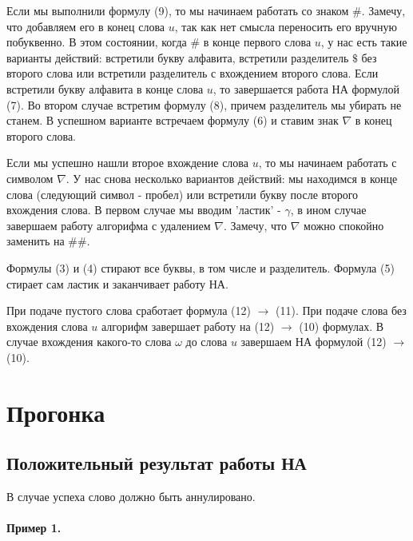  \medskip

 Если мы выполнили формулу (9), то мы начинаем работать со знаком $\#$.
 Замечу, что добавляем его в конец слова $u$, так как нет смысла переносить его вручную побуквенно.
 В этом состоянии, когда $\#$ в конце первого слова  $u$, у нас есть такие варианты действий:
 встретили букву алфавита, встретили разделитель  $\$$ без второго слова или встретили
 разделитель с вхождением второго слова. Если встретили букву алфавита в конце слова  $u$, то
 завершается работа НА формулой (7). Во втором случае встретим формулу (8), причем разделитель
 мы убирать не станем. В успешном варианте встречаем формулу (6) и ставим знак  $\nabla $ в конец
 второго слова.

 \medskip

 Если мы успешно нашли второе вхождение слова $u$, то мы начинаем работать с символом
  $\nabla $. У нас снова несколько вариантов действий: мы находимся в конце слова (следующий
  символ - пробел) или встретили букву после второго вхождения слова. В первом случае
  мы вводим 'ластик' - $\gamma$, в ином случае завершаем работу алгорифма с удалением
  $\nabla $. Замечу, что $\nabla$ можно спокойно заменить на $\#\#$.

  Формулы (3) и (4) стирают все буквы, в том числе и разделитель. Формула (5) стирает
  сам ластик и заканчивает работу НА.

  \medskip

  При подаче пустого слова сработает формула (12) $\to$ (11). При подаче слова без вхождения
  слова $u$ алгорифм завершает работу на \newline (12) $\to$ (10) формулах. В случае
  вхождения какого-то слова $\omega$ до слова  $u$ завершаем НА формулой (12) $\to $ (10).

\newpage
\section{Прогонка}

\subsection{Положительный результат работы НА}

В случае успеха слово должно быть аннулировано.

\paragraph*{Пример 1.} ${}$\newline

